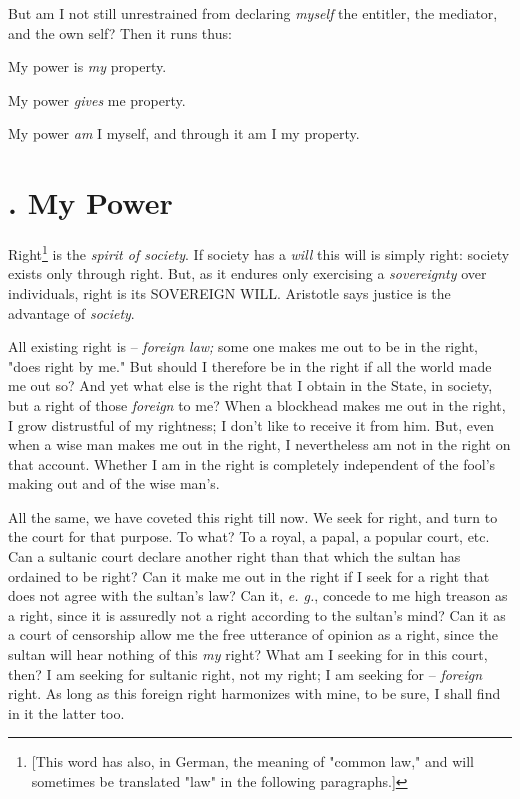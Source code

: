 \documentclass[a4paper]{book}
\begin{document}
But am I not still unrestrained from declaring \textit{myself} the entitler, 
the mediator, and the own self? Then it runs thus:

My power is \textit{my} property.

My power \textit{gives} me property.

My power \textit{am} I myself, and through it am I my property.

\section[1. My Power]{. My Power}

Right\footnote{[This word has also, in German, the meaning of "{}common 
law,"{} and will sometimes be translated "{}law"{} in the following 
paragraphs.]} is the \textit{spirit of society}. If society has a 
\textit{will} this will is simply right: society exists only through right. 
But, as it endures only exercising a \textit{sovereignty} over individuals, 
right is its SOVEREIGN WILL. Aristotle says justice is the advantage of 
\textit{society}.

All existing right is -- \textit{foreign law;} some one makes me out to be in 
the right, "{}does right by me."{} But should I therefore be in the right if 
all the world made me out so? And yet what else is the right that I obtain in 
the State, in society, but a right of those \textit{foreign} to me? When a 
blockhead makes me out in the right, I grow distrustful of my rightness; I 
don't like to receive it from him. But, even when a wise man makes me out in 
the right, I nevertheless am not in the right on that account. Whether I am in 
the right is completely independent of the fool's making out and of the wise 
man's.

All the same, we have coveted this right till now. We seek for right, and turn 
to the court for that purpose. To what? To a royal, a papal, a popular court, 
etc. Can a sultanic court declare another right than that which the sultan has 
ordained to be right? Can it make me out in the right if I seek for a right 
that does not agree with the sultan's law? Can it, \textit{e. g.}, concede to 
me high treason as a right, since it is assuredly not a right according to the 
sultan's mind? Can it as a court of censorship allow me the free utterance of 
opinion as a right, since the sultan will hear nothing of this \textit{my} 
right? What am I seeking for in this court, then? I am seeking for sultanic 
right, not my right; I am seeking for -- \textit{foreign} right. As long as 
this foreign right harmonizes with mine, to be sure, I shall find in it the 
latter too.
\end{document}
